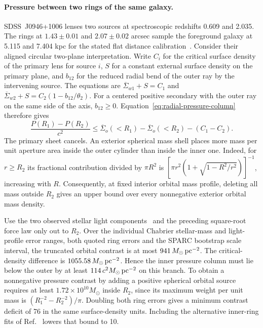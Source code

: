 \documentclass[11pt]{article}
\begin{document}
\paragraph{Pressure between two rings of the same galaxy.}
SDSS~J0946+1006 lenses two sources at spectroscopic redshifts 0.609
and 2.035. The rings at $1.43\pm0.01$ and $2.07\pm0.02$ arcsec sample
the foreground galaxy at 5.115 and 7.404 kpc for the stated flat
distance calibration~\cite{jackpot2008,jackpot2021}. Consider their
aligned circular two-plane interpretation. Write $C_i$ for the critical
surface density of the primary lens for source $i$, $S$ for a constant
external surface density on the primary plane, and $b_{12}$ for the
reduced radial bend of the outer ray by the intervening source.
The equations are $\overline\Sigma_{w1}+S=C_1$ and
$\overline\Sigma_{w2}+S=C_2(1-b_{12}/\theta_2)$. For a centered
positive secondary with the outer ray on the same side of the axis,
$b_{12}\ge0$. Equation~\eqref{eq:radial-pressure-column} therefore gives
\[
 \frac{P(R_1)-P(R_2)}{c^2}
 \le \overline\Sigma_o(<R_1)-\overline\Sigma_o(<R_2)-(C_1-C_2).
\]
The primary sheet cancels. An exterior spherical mass shell places
more mass per unit aperture area inside the outer cylinder than
inside the inner one. Indeed, for $r\ge R_2$ its fractional
contribution divided by $\pi R^2$ is
$[\pi r^2(1+\sqrt{1-R^2/r^2})]^{-1}$, increasing with $R$.
Consequently, at fixed interior orbital mass profile, deleting all
mass outside $R_2$ gives an upper bound over every nonnegative
exterior orbital mass density.

Use the two observed stellar light components~\cite{jackpot2012} and
the preceding square-root force law only out to $R_2$. Over the
individual Chabrier stellar-mass and light-profile error ranges,
both quoted ring errors and the SPARC bootstrap scale interval,
the truncated orbital contrast is at most
$941\,M_\odot\,{\rm pc}^{-2}$. The critical-density difference is
$1055.58\,M_\odot\,{\rm pc}^{-2}$. Hence the inner pressure column
must lie below the outer by at least $114\,c^2 M_\odot\,{\rm pc}^{-2}$
on this branch. To obtain a nonnegative pressure contrast by
adding a positive spherical orbital source requires at least
$1.72\times10^{10}M_\odot$ inside $R_2$, since its maximum weight
per unit mass is $(R_1^{-2}-R_2^{-2})/\pi$. Doubling both ring
errors gives a minimum contrast deficit of 76 in the same surface-density
units. Including the alternative inner-ring fits of
Ref.~\cite{bolton2008} lowers that bound to 10.
\end{document}
